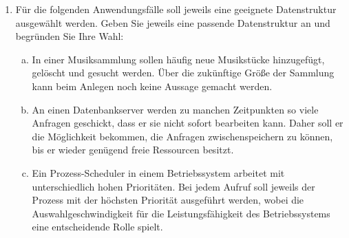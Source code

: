 \documentclass{scrartcl}
\begin{document}
\begin{enumerate}[(1)]
\item Für die folgenden Anwendungsfälle soll jeweils eine geeignete Datenstruktur ausgewählt werden. Geben Sie jeweils eine passende Datenstruktur an und begründen Sie Ihre Wahl:
\begin{enumerate}[(a)]
\item In einer Musiksammlung sollen häufig neue Musikstücke hinzugefügt, gelöscht und gesucht werden. Über die zukünftige Größe der Sammlung kann beim Anlegen noch keine Aussage gemacht werden.
\item An einen Datenbankserver werden zu manchen Zeitpunkten so viele Anfragen geschickt, dass er sie nicht sofort bearbeiten kann. Daher soll er die Möglichkeit bekommen, die Anfragen zwischenspeichern zu können, bis er wieder genügend freie Ressourcen besitzt.
\item Ein Prozess-Scheduler in einem Betriebssystem arbeitet mit unterschiedlich hohen Prioritäten. Bei jedem Aufruf soll jeweils der Prozess mit der höchsten Priorität ausgeführt werden, wobei die Auswahlgeschwindigkeit für die Leistungsfähigkeit des Betriebssystems eine entscheidende Rolle spielt.
\end{enumerate}


\end{enumerate}
\end{document}
